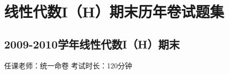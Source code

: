 \chapter*{线性代数I（H）期末历年卷试题集}

\section*{2009-2010学年线性代数I（H）期末}

\begin{center}
    任课老师：统一命卷\hspace{4em} 考试时长：120分钟
\end{center}

